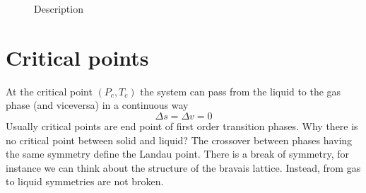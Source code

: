 \documentclass[../main/main.tex]{subfiles}
\begin{document}
\begin{figure}[h!]
\begin{minipage}[]{0.5\linewidth}
{

    \label{fig:2_8_2} }
\end{minipage}
\caption{\label{fig:2_8} Description}
\end{figure}



\section{Critical points}
At the critical point \( (P_c,T_c) \) the system can pass from the liquid to the gas phase (and viceversa) in a continuous way
\begin{equation}
  \Delta s = \Delta v = 0
  \label{eq:}
\end{equation}
Usually critical points are end point of first order transition phases. Why there is no critical point between solid and liquid? The crossover between phases having the same symmetry define the Landau point. There is a break of symmetry, for instance we can think about the structure of the bravais lattice. Instead, from gas to liquid symmetries are not broken.
\end{document}
